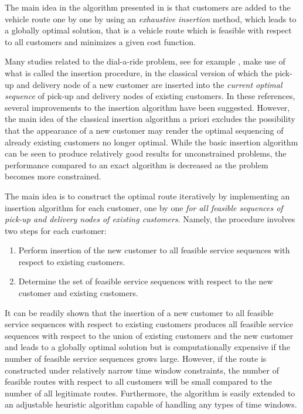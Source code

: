 \documentclass[dissertation,draft*]{aaltoseries}
\begin{document}
The main idea in the algorithm presented in  is that customers are added to 
the vehicle route one by one by using an \emph{exhaustive insertion} method,
which leads to a globally optimal solution, that is a vehicle route 
which is feasible with respect to all customers and minimizes a given cost function. 

Many studies related to the dial-a-ride problem, see for example \cite{jaw,madsen,diana,wong},
make use of what is called the insertion procedure, in the classical version of which   
the pick-up and delivery node of a new customer are inserted into the 
\emph{current optimal sequence} of pick-up and delivery nodes of existing customers.
In these references, several improvements to the insertion algorithm 
have been suggested. However, the main idea of the classical insertion algorithm a priori
excludes the possibility that the appearance of a new customer may render
the optimal sequencing of already existing customers no longer optimal.
While the basic insertion algorithm can be seen to
produce relatively good results for unconstrained problems, 
the performance compared to an exact algorithm is decreased as the
problem becomes more constrained.

The main idea is to construct the optimal route iteratively by implementing 
an insertion algorithm for each customer, one by one \emph{for all feasible sequences 
of pick-up and delivery nodes of existing customers}.
Namely, the procedure involves two steps for each customer:
\begin{enumerate}
	\item 
	Perform insertion of the new customer to all feasible service sequences with respect to
	existing customers.
	\item
	Determine the set of feasible service sequences with respect to the new customer and existing customers.
\end{enumerate}

It can be readily shown that the insertion of a new customer to all feasible service sequences with respect to 
existing customers 
produces all feasible service sequences with respect to the union of existing customers 
and the new customer and leads to a globally optimal solution but is computationally expensive
if the number of feasible service sequences grows large. However, if the route is constructed under relatively narrow time window constraints,
the number of feasible routes with respect to all customers
will be small compared to the number of all legitimate routes. 
Furthermore, the algorithm is easily extended to an adjustable heuristic algorithm
capable of handling any types of time windows. 
\end{document}
